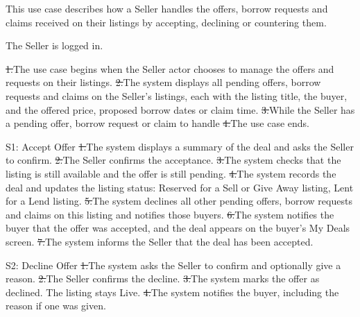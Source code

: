 This use case describes how a Seller handles the offers, borrow requests and claims received on their listings by accepting, declining or countering them.\par
{}
The Seller is logged in.\par
{}
\st{1.}{The use case begins when the Seller actor chooses to manage the offers and requests on their listings.}
\st{2.}{The system displays all pending offers, borrow requests and claims on the Seller's listings, each with the listing title, the buyer, and the offered price, proposed borrow dates or claim time.}
\st{3.}{While the Seller has a pending offer, borrow request or claim to handle}
\st{4.}{The use case ends.}
\begin{flowblock}{S1: Accept Offer}
\st{1.}{The system displays a summary of the deal and asks the Seller to confirm.}
\st{2.}{The Seller confirms the acceptance.}
\st{3.}{The system checks that the listing is still available and the offer is still pending.}
\st{4.}{The system records the deal and updates the listing status: Reserved for a Sell or Give Away listing, Lent for a Lend listing.}
\st{5.}{The system declines all other pending offers, borrow requests and claims on this listing and notifies those buyers.}
\st{6.}{The system notifies the buyer that the offer was accepted, and the deal appears on the buyer's My Deals screen.}
\st{7.}{The system informs the Seller that the deal has been accepted.}
\end{flowblock}
\begin{flowblock}{S2: Decline Offer}
\st{1.}{The system asks the Seller to confirm and optionally give a reason.}
\st{2.}{The Seller confirms the decline.}
\st{3.}{The system marks the offer as declined. The listing stays Live.}
\st{4.}{The system notifies the buyer, including the reason if one was given.}
\end{flowblock}
